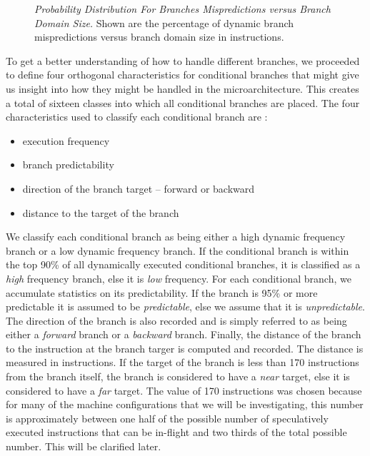 \documentclass[10pt,dvips]{article}
\begin{document}
\begin{figure}
\vspace{0.2 in}
\setlength{\epsfxsize}{10cm}%
\centerline{}
\caption{{\em Probability Distribution For Branches Mispredictions
versus
Branch Domain Size.} 
Shown are the percentage of dynamic branch mispredictions versus 
branch domain size
in instructions.}
\label{fig:mispredictions}
\end{figure}

To get a better understanding of how to handle different branches,
we proceeded to define four orthogonal characteristics
for conditional branches that might give us insight into
how they might be handled in the microarchitecture.
This creates a total of sixteen classes into which all conditional 
branches are placed.
The four characteristics used to classify each conditional branch are :

\begin{itemize}
\item{execution frequency}
\item{branch predictability}
\item{direction of the branch target -- forward or backward}
\item{distance to the target of the branch}
\end{itemize}   

We classify each conditional branch as 
being either a high dynamic frequency branch
or a low dynamic frequency branch.  If the conditional branch
is within the top 90\% of all dynamically executed conditional branches,
it is classified as a \textit{high} frequency branch, else it 
is \textit{low} frequency.
For each conditional branch, we accumulate statistics on
its predictability.  If the branch is 95\% or more predictable
it is assumed to be 
\textit{predictable}, else we assume that it is
\textit{unpredictable}.
The direction of the branch is also recorded and is simply
referred to as being either a 
\textit{forward} branch or a 
\textit{backward} branch.
Finally, the distance of the branch to 
the instruction at the
branch targer is computed and recorded.  The distance is measured
in instructions.  If the target of the branch is less than 170 instructions
from the branch itself, the branch is considered to have a 
\textit{near} target, else it is considered to have a
\textit{far} target.  The value of 170 instructions was chosen
because for many of the machine configurations that we will be
investigating, this number is approximately between one half of
the possible number of speculatively executed instructions
that can be in-flight and two thirds of the total possible number.
This will be clarified later.
\end{document}
